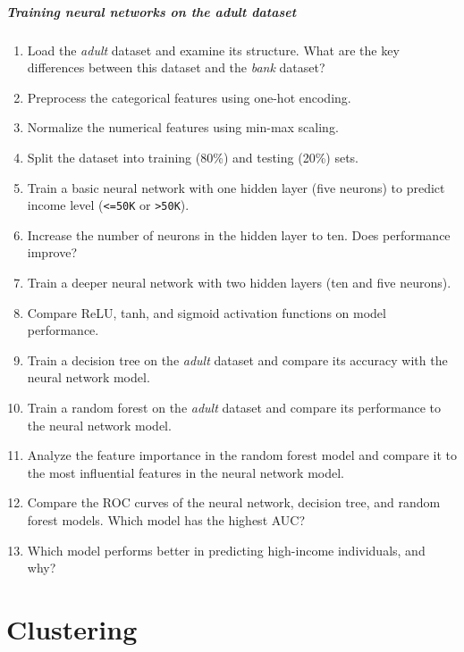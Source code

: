 \documentclass[
  11pt,
]{book}
\newcommand{\passthrough}[1]{#1}
\providecommand{\tightlist}{%
  \setlength{\itemsep}{0pt}\setlength{\parskip}{0pt}}
\theoremstyle{definition}
\theoremstyle{definition}
\theoremstyle{definition}
\theoremstyle{definition}
\theoremstyle{remark}
\begin{document}
\paragraph*{\texorpdfstring{Training neural networks on the \emph{adult} dataset}{Training neural networks on the adult dataset}}\label{training-neural-networks-on-the-adult-dataset}

\begin{enumerate}
\def\labelenumi{\arabic{enumi}.}
\setcounter{enumi}{28}
\tightlist
\item
  Load the \emph{adult} dataset and examine its structure. What are the key differences between this dataset and the \emph{bank} dataset?
\item
  Preprocess the categorical features using one-hot encoding.
\item
  Normalize the numerical features using min-max scaling.
\item
  Split the dataset into training (80\%) and testing (20\%) sets.
\item
  Train a basic neural network with one hidden layer (five neurons) to predict income level (\passthrough{\lstinline!<=50K!} or \passthrough{\lstinline!>50K!}).
\item
  Increase the number of neurons in the hidden layer to ten. Does performance improve?
\item
  Train a deeper neural network with two hidden layers (ten and five neurons).
\item
  Compare ReLU, tanh, and sigmoid activation functions on model performance.
\item
  Train a decision tree on the \emph{adult} dataset and compare its accuracy with the neural network model.
\item
  Train a random forest on the \emph{adult} dataset and compare its performance to the neural network model.
\item
  Analyze the feature importance in the random forest model and compare it to the most influential features in the neural network model.
\item
  Compare the ROC curves of the neural network, decision tree, and random forest models. Which model has the highest AUC?
\item
  Which model performs better in predicting high-income individuals, and why?
\end{enumerate}

\chapter{Clustering}\label{chapter-cluster}
\end{document}
